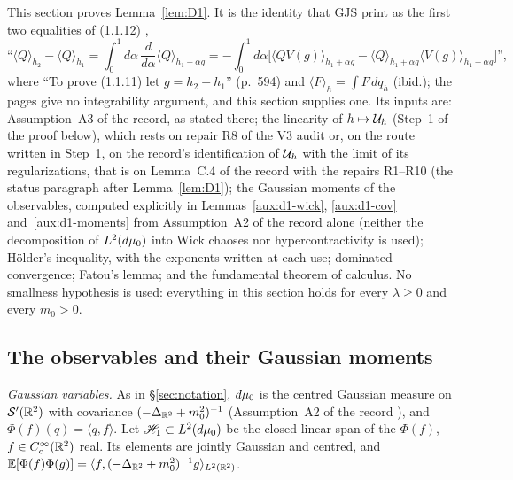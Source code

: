 
This section proves Lemma~\ref{lem:D1}. It is the identity that GJS print as the first two
equalities of (1.1.12) \cite[p.~595]{GJS},
\[
 \text{``}\langle Q\rangle_{h_2}-\langle Q\rangle_{h_1}
 =\int_0^1d\alpha\,\frac{d}{d\alpha}\langle Q\rangle_{h_1+\alpha g}
 =-\int_0^1d\alpha\bigl[\langle QV(g)\rangle_{h_1+\alpha g}
 -\langle Q\rangle_{h_1+\alpha g}\langle V(g)\rangle_{h_1+\alpha g}\bigr]\text{''},
\]
where ``To prove (1.1.11) let $g=h_2-h_1$'' (p.~594) and $\langle F\rangle_h=\int F\,dq_h$
(ibid.); the pages give no integrability argument, and this section supplies one. Its inputs
are: Assumption~A3 of the record, as stated there; the linearity of $h\mapsto\mathcal U_h$ (Step~1
of the proof below), which rests on repair R8 of the V3 audit or, on the route written in
Step~1, on the record's identification of $\mathcal U_h$ with the limit of its regularizations, that is
on Lemma~C.4 of the record with the repairs R1--R10 (the status paragraph after
Lemma~\ref{lem:D1}); the Gaussian moments of the observables, computed explicitly in
Lemmas~\ref{aux:d1-wick}, \ref{aux:d1-cov} and~\ref{aux:d1-moments} from Assumption~A2 of the
record alone (neither the decomposition of $L^2(d\mu_0)$ into Wick chaoses nor
hypercontractivity is used); H\"older's inequality, with the exponents written at each use;
dominated convergence; Fatou's lemma; and the fundamental theorem of calculus. No smallness
hypothesis is used: everything in this section holds for every $\lambda\ge0$ and every
$m_0>0$.

\subsection*{The observables and their Gaussian moments}

\emph{Gaussian variables.} As in \S\ref{sec:notation}, $d\mu_0$ is the centred Gaussian measure
on $\mathcal S'(\mathbb{R}^2)$ with covariance $(-\Delta_{\mathbb{R}^2}+m_0^2)^{-1}$ (Assumption~A2 of the
record \cite[p.~8]{R}), and $\Phi(f)(q)=\langle q,f\rangle$. Let $\mathscr H_1\subset
L^2(d\mu_0)$ be the closed linear span of the $\Phi(f)$, $f\in C_c^\infty(\mathbb{R}^2)$ real. Its
elements are jointly Gaussian and centred, and
$\mathbb{E}[\Phi(f)\Phi(g)]=\langle f,(-\Delta_{\mathbb{R}^2}+m_0^2)^{-1}g\rangle_{L^2(\mathbb{R}^2)}$.

